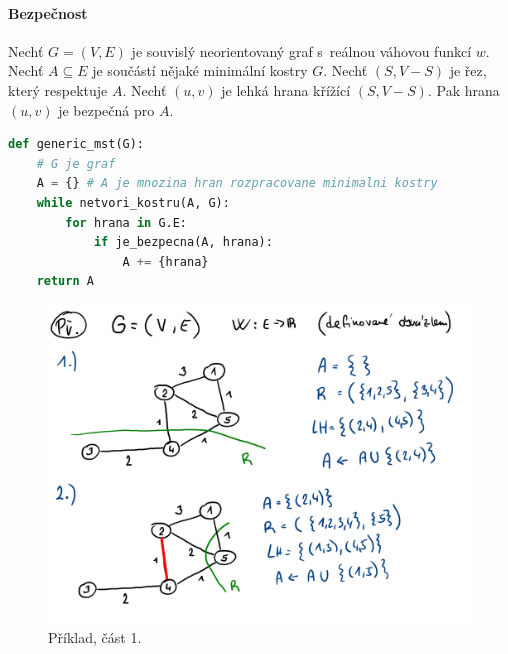 \paragraph*{Bezpečnost} Nechť $G = (V, E)$ je souvislý neorientovaný graf s~reálnou váhovou funkcí $w$. Nechť $A \subseteq E$ je součástí nějaké minimální kostry $G$. Nechť $(S, V - S)$ je řez, který respektuje $A$. Nechť $(u, v)$ je lehká hrana křížící $(S, V - S)$. Pak hrana $(u, v)$ je bezpečná pro $A$.

\bigskip\noindent\begin{minipage}{\linewidth}
    \begin{lstlisting}[language=Python, caption={Generický algoritmus. Před každou iterací algoritmu je množina $A$ podmnožinou nějaké minimální kostry. Hrana $(u,v) \in E$ je bezpečná pro $A$, pokud $A \cup \{(u, v)\}$ je podmnožinou nějaké minimální kostry.}]
def generic_mst(G):
    # G je graf
    A = {} # A je mnozina hran rozpracovane minimalni kostry
    while netvori_kostru(A, G):
        for hrana in G.E:
            if je_bezpecna(A, hrana):
                A += {hrana}
    return A
\end{lstlisting}
\end{minipage}

\begin{figure}[H]
    \centering
    \includegraphics[width=0.9\linewidth]{03-minimalni-kostry-6.pdf}
    \caption{Příklad, část 1.}
\end{figure}

